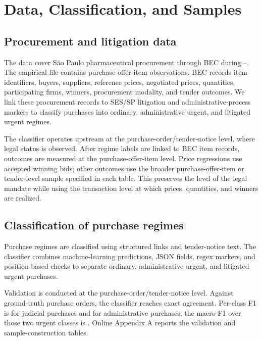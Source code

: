 \section{Data, Classification, and Samples}
\label{sec:data}

\subsection{Procurement and litigation data}
\label{subsec:data_sources}

The data cover S\~ao Paulo pharmaceutical procurement through BEC during \BPsampleStartYear--\BPsampleEndYear. The empirical file contains \BPnPOIfull{} purchase-offer-item observations. BEC records item identifiers, buyers, suppliers, reference prices, negotiated prices, quantities, participating firms, winners, procurement modality, and tender outcomes. We link these procurement records to SES/SP litigation and administrative-process markers to classify purchases into ordinary, administrative urgent, and litigated urgent regimes.

The classifier operates upstream at the purchase-order/tender-notice
level, where legal status is observed. After regime labels are linked
to BEC item records, outcomes are measured at the
purchase-offer-item level. Price regressions use accepted winning
bids; other outcomes use the broader purchase-offer-item or
tender-level sample specified in each table. This preserves the level
of the legal mandate while using the transaction level at which
prices, quantities, and winners are realized.

\subsection{Classification of purchase regimes}
\label{subsec:classification}

Purchase regimes are classified using structured links and
tender-notice text. The classifier combines machine-learning
predictions, JSON fields, regex markers, and position-based checks to
separate ordinary, administrative urgent, and litigated urgent
purchases.

Validation is conducted at the purchase-order/tender-notice level.
Against \BPregexNGroundTruth{} ground-truth purchase orders, the
classifier reaches \BPregexExactMatchPct{} exact agreement. Per-class
F1 is \BPregexFoneJud{} for judicial purchases and \BPregexFoneAdm{}
for administrative purchases; the macro-F1 over those two urgent
classes is \BPregexFone{}. Online Appendix A reports the validation
and sample-construction tables.


